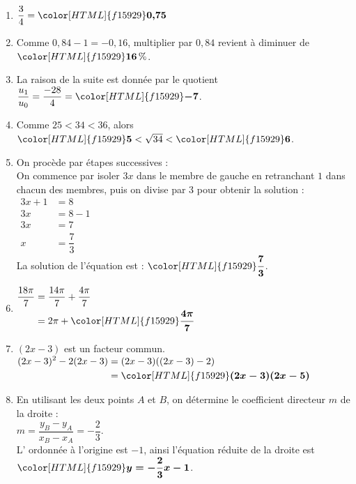 \documentclass[a4paper,11pt,landscape,exos]{nsi} %
\begin{document}
\begin{multicols}{2}
\begin{enumerate}[itemsep=1em]
    \item $\dfrac{3}{4}={\color[HTML]{f15929}\boldsymbol{0{,}75}}$
    \item Comme $0{,}84-1=-0{,}16$, multiplier par $0{,}84$ revient à diminuer de ${\color[HTML]{f15929}\boldsymbol{16}}\,\%$. 
    \item La raison de la suite est donnée par le quotient $\dfrac{u_1}{u_0}=\dfrac{-28}{4}={\color[HTML]{f15929}\boldsymbol{-7}}$.
    \item Comme $25 < 34 < 36$, alors 
        ${\color[HTML]{f15929}\boldsymbol{5}} < \sqrt{34} < {\color[HTML]{f15929}\boldsymbol{6}}$.
    \item On procède par étapes successives :\\
          On commence par isoler $3x$ dans le membre de gauche en retranchant
          $1$ dans chacun des membres, puis on divise
          par $3$ pour obtenir la solution : \\
           $\begin{aligned}
           3x+1&=8\\
          3x&=8-1\\
          3x&=7\\
          x&=\dfrac{7}{3}    
          \end{aligned}$\\
          La solution de l'équation est : ${\color[HTML]{f15929}\boldsymbol{\dfrac{7}{3}}}$.
          
    \item $\begin{aligned}
          \dfrac{18\pi}{7}&=\dfrac{14\pi}{7}+\dfrac{4\pi}{7}\\
          &=2\pi+{\color[HTML]{f15929}\boldsymbol{\dfrac{4\pi}{7}}}
          \end{aligned}$
\vfill\null
\columnbreak
    \item $(2x-3)$ est un facteur commun.\\
          $\begin{aligned}
          (2x-3)^2-2(2x-3)
          &=(2x-3)((2x-3)-2)\\
          &={\color[HTML]{f15929}\boldsymbol{(2x-3)(2x-5)}}\end{aligned}$
    
    \item En utilisant les deux points $A$ et $B$, on détermine le coefficient directeur $m$ de la droite : \\
        $m=\dfrac{y_B-y_A}{x_B-x_A}=-\dfrac{2}{3}$.\\
             L' ordonnée à l'origine est $-1$, ainsi l'équation réduite de la droite est ${\color[HTML]{f15929}\boldsymbol{y=-\dfrac{2}{3}x-1}}$.
    

\end{enumerate}
\end{multicols}
\end{document}

